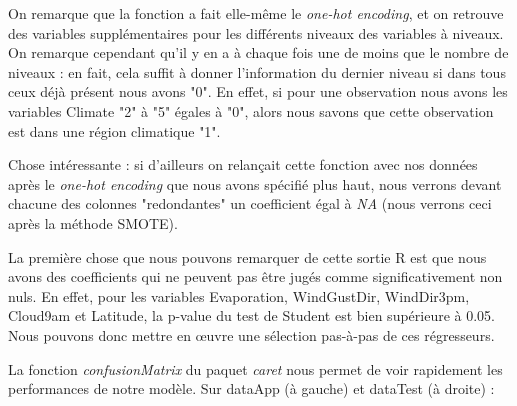 \documentclass{article}
\begin{document}
On remarque que la fonction a fait elle-même le \emph{one-hot encoding}, et on retrouve des variables supplémentaires pour les différents niveaux des variables à niveaux. On remarque cependant qu'il y en a à chaque fois une de moins que le nombre de niveaux : en fait, cela suffit à donner l'information du dernier niveau si dans tous ceux déjà présent nous avons "0". En effet, si pour une observation nous avons les variables Climate "2" à "5" égales à "0", alors nous savons que cette observation est dans une région climatique "1". 

Chose intéressante : si d'ailleurs on relançait cette fonction avec nos données après le \emph{one-hot encoding} que nous avons spécifié plus haut, nous verrons devant chacune des colonnes "redondantes" un coefficient égal à \emph{NA} (nous verrons ceci après la méthode SMOTE).

La première chose que nous pouvons remarquer de cette sortie R est que nous avons des coefficients qui ne peuvent pas être jugés comme significativement non nuls. En effet, pour les variables Evaporation, WindGustDir, WindDir3pm, Cloud9am et Latitude, la p-value du test de Student est bien supérieure à 0.05. Nous pouvons donc mettre en œuvre une sélection pas-à-pas de ces régresseurs.  

La fonction \emph{confusionMatrix} du paquet \emph{caret} nous permet de voir rapidement les performances de notre modèle. Sur dataApp (à gauche) et dataTest (à droite) : 
\end{document}
